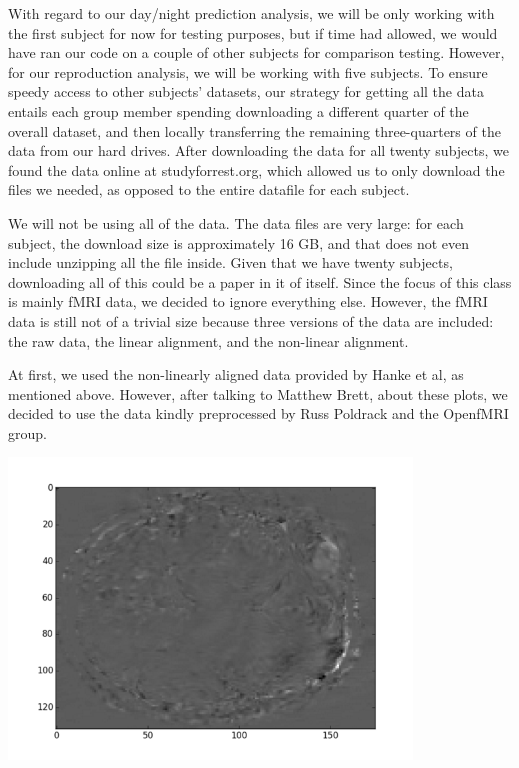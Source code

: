 With regard to our day/night prediction analysis, we will be only working with  
the first subject for now for testing purposes, but if time had allowed, we     
would have ran our code on a couple of other subjects for comparison testing.   
However, for our reproduction analysis, we will be working with five subjects.  
To ensure speedy access to other subjects' datasets, our strategy for getting all 
the data entails each group member spending downloading a different quarter of the 
overall dataset, and then locally transferring the remaining three-quarters of the 
data from our hard drives.  After downloading the data for all twenty subjects, we 
found the data online at studyforrest.org, which allowed us to only download the 
files we needed, as opposed to the entire datafile for each subject.  

We will not be using all of the data. The data files are very large: for each 
subject, the download size is approximately 16 GB, and that does not even 
include unzipping all the file inside. Given that we have twenty subjects, 
downloading all of this could be a paper in it of itself. Since the focus of 
this class is mainly fMRI data, we decided to ignore everything else. However, 
the fMRI data is still not of a trivial size because three versions of the data 
are included: the raw data, the linear alignment, and the non-linear alignment.   

At first, we used the non-linearly aligned data provided by Hanke et al, as
mentioned above.  However, after talking to Matthew Brett, about these plots, 
we decided to use the data kindly preprocessed by Russ Poldrack and the OpenfMRI 
group.  
\begin{center}                                                                  
\includegraphics[height=8cm]{1}                                                 
\end{center}    


